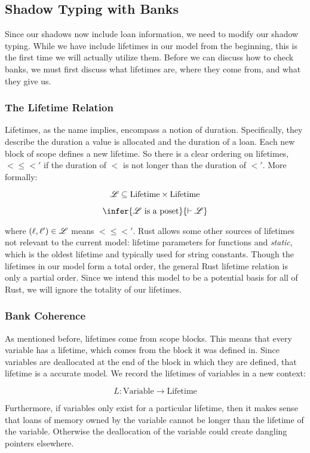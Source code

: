 \subsection*{Shadow Typing with Banks}
Since our shadows now include loan information, we need to modify our shadow typing.
While we have include lifetimes in our model from the beginning, this is the first time
we will actually utilize them. Before we can discuss how to check banks, we must first
discuss what lifetimes are, where they come from, and what they give us.

\subsubsection*{The Lifetime Relation}
Lifetimes, as the name implies, encompass a notion of duration.
Specifically, they describe the duration a value is allocated and 
the duration of a loan. Each new block of scope defines a new lifetime.
So there is a clear ordering on lifetimes, $\lt \leq \lt'$ if the duration of $\lt$
is not longer than the duration of $\lt'$. More formally:

$$ \mathscr{L} \subseteq \textrm{Lifetime} \times \textrm{Lifetime} $$

$$ \infer{\ltr \ \textrm{is a poset}}{\vdash \ltr} $$

where $(\ell, \ell') \in \mathscr{L}$ means $\lt \leq \lt'$. Rust allows some other sources of lifetimes
not relevant to the current model: lifetime parameters for functions and \emph{static}, which
is the oldest lifetime and typically used for string constants. Though the lifetimes in our
model form a total order, the general Rust lifetime relation is only a partial order.
Since we intend this model to be a potential basis for all of Rust, we will ignore the
totality of our lifetimes.

\subsubsection*{Bank Coherence}
As mentioned before, lifetimes come from scope blocks.
This means that every variable has a lifetime, which comes from the block it was defined in.
Since variables are deallocated at the end of the block in which they are defined,
that lifetime is a accurate model. We record the lifetimes of variables in a new context:

$$ L : \textrm{Variable} \rightarrow \textrm{Lifetime} $$

Furthermore, if variables only exist for a particular lifetime, then it makes sense that
loans of memory owned by the variable cannot be longer than the lifetime of the variable.
Otherwise the deallocation of the variable could create dangling pointers elsewhere.

